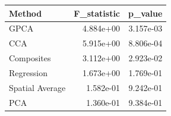 \begin{tabular}{lrr}
\toprule
Method & F_statistic & p_value \\
\midrule
GPCA & 4.884e+00 & 3.157e-03 \\
CCA & 5.915e+00 & 8.806e-04 \\
Composites & 3.112e+00 & 2.923e-02 \\
Regression & 1.673e+00 & 1.769e-01 \\
Spatial Average & 1.582e-01 & 9.242e-01 \\
PCA & 1.360e-01 & 9.384e-01 \\
\bottomrule
\end{tabular}

